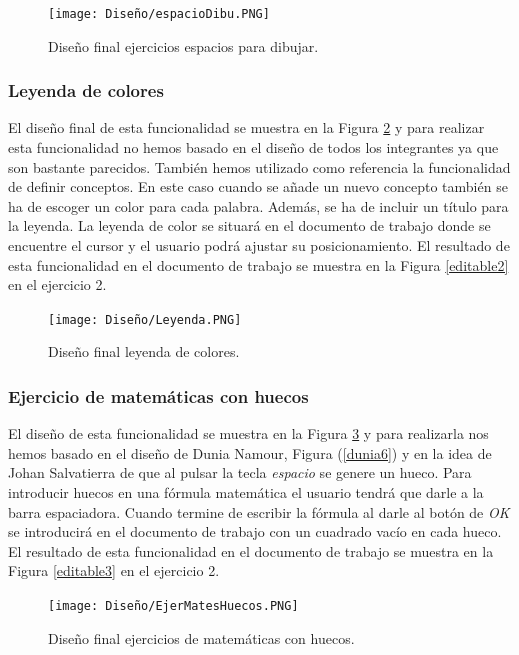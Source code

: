 \begin{figure}[ht!]
  \centering
  \texttt{[image: Diseño/espacioDibu.PNG]}
  \caption{Diseño final ejercicios espacios para dibujar.}
  \label{espaciosDibu}
\end{figure}

\subsubsection{Leyenda de colores}
El diseño final de esta funcionalidad se muestra en la Figura \ref{LeyendaColores} y para realizar esta funcionalidad no hemos basado en el diseño de todos los integrantes ya que son bastante parecidos. También hemos utilizado como referencia la funcionalidad de definir conceptos. En este caso cuando se añade un nuevo concepto también se ha de escoger un color para cada palabra. Además, se ha de incluir un título para la leyenda. La leyenda de color se situará en el documento de trabajo donde se encuentre el cursor y el usuario podrá ajustar su posicionamiento. El resultado de esta funcionalidad en el documento de trabajo se muestra en la Figura \ref{editable2} en el ejercicio 2.

\begin{figure}[ht!]
  \centering
  \texttt{[image: Diseño/Leyenda.PNG]}
  \caption{Diseño final leyenda de colores.}
  \label{LeyendaColores}
\end{figure}

\subsubsection{Ejercicio de matemáticas con huecos}
El diseño de esta funcionalidad se muestra en la Figura \ref{matesHueco} y para realizarla nos hemos basado en el diseño de Dunia Namour, Figura (\ref{dunia6}) y en la idea de Johan Salvatierra de que al pulsar la tecla \textit{espacio} se genere un hueco. Para introducir huecos en una fórmula matemática el usuario tendrá que darle a la barra espaciadora. Cuando termine de escribir la fórmula al darle al botón de \textit{OK} se introducirá en el documento de trabajo con un cuadrado vacío en cada hueco. El resultado de esta funcionalidad en el documento de trabajo se muestra en la Figura \ref{editable3} en el ejercicio 2.

\begin{figure}[ht!]
  \centering
  \texttt{[image: Diseño/EjerMatesHuecos.PNG]}
  \caption{Diseño final ejercicios de matemáticas con huecos.}
  \label{matesHueco}
\end{figure}

